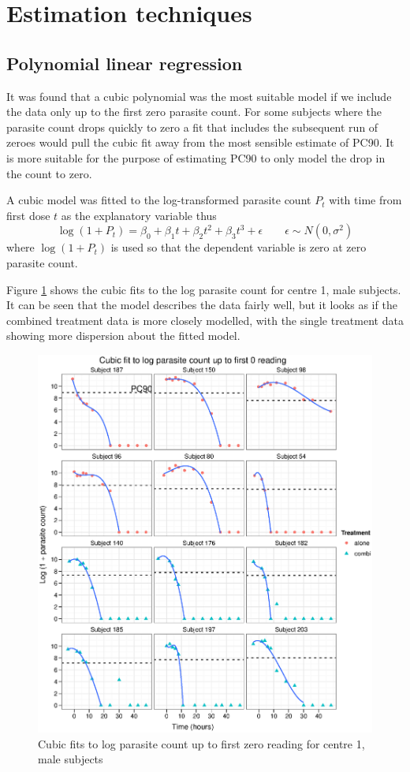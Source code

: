 \section{Estimation techniques}
\subsection{Polynomial linear regression}
It was found that a cubic polynomial was the most suitable model if we include the data only up to the first zero parasite count. For some subjects where the parasite count drops quickly to zero a fit that includes the subsequent run of zeroes would pull the cubic fit away from the most sensible estimate of PC90. It is more suitable for the purpose of estimating PC90 to only model the drop in the count to zero.

A cubic model was fitted to the log-transformed parasite count $P_{t}$ with time from first dose $t$ as the explanatory variable thus
$$\log(1+P_{t})=\beta_0+\beta_1t+\beta_2t^2+\beta_3t^3+\epsilon\quad\quad\epsilon\sim N(0,\sigma^2)$$
where $\log(1+P_{t})$ is used so that the dependent variable is zero at zero parasite count.

Figure \ref{cubics} shows the cubic fits to the log parasite count for centre 1, male subjects. It can be seen that the model describes the data fairly well, but it looks as if the combined treatment data is more closely modelled, with the single treatment data showing more dispersion about the fitted model. 
\begin{figure}[p]
\includegraphics[width=150mm]{cubics.eps} 
\caption{Cubic fits to log parasite count up to first zero reading for centre 1, male subjects}\label{cubics}
\end{figure}

